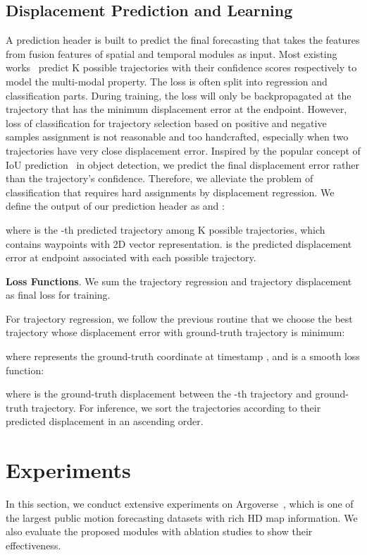 \documentclass[final]{cvpr}
\begin{document}
\subsection{Displacement Prediction and Learning}
A prediction header is built to predict the final forecasting that takes the features from fusion features of spatial and temporal modules as input. Most existing works~\cite{chai2019multipath, cui2019multimodal, liang2020learning} predict K possible trajectories with their confidence scores respectively to model the multi-modal property. The loss is often split into regression and classification parts. During training, the loss will only be backpropagated at the trajectory that has the minimum displacement error at the endpoint. However, loss of classification for trajectory selection based on positive and negative samples assignment is not reasonable and too handcrafted, especially when two trajectories have very close displacement error.
Inspired by the popular concept of IoU prediction~\cite{jiang2018acquisition} in object detection, we predict the final displacement error rather than the trajectory's confidence. Therefore, we alleviate the problem of classification that requires hard assignments by displacement regression. We define the output of our prediction header as  and :

where  is the -th predicted trajectory among K possible trajectories, which contains  waypoints with 2D  vector representation.  is the predicted displacement error at endpoint associated with each possible trajectory.

\textbf{Loss Functions}. We sum the trajectory regression  and trajectory displacement  as final loss for training.


For trajectory regression, we follow the previous routine that we choose the best trajectory  whose displacement error with ground-truth trajectory is minimum:

where  represents the ground-truth coordinate at timestamp , and  is a smooth  loss function:

where  is the ground-truth displacement between the -th trajectory and ground-truth trajectory.  For inference, we sort the trajectories according to their predicted displacement in an ascending order.

\section{Experiments}
In this section, we conduct extensive experiments on Argoverse~\cite{chang2019argoverse}, which is one of the largest public motion forecasting datasets with rich HD map information. We also evaluate the proposed modules with ablation studies to show their effectiveness. 
\end{document}
